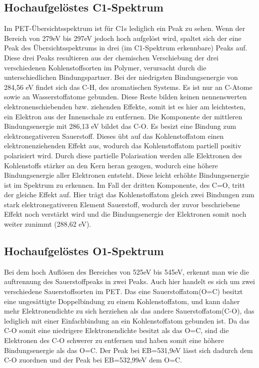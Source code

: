 \documentclass{article}
\begin{document}
\subsection{Hochaufgelöstes C1-Spektrum }

Im PET-Übersichtsspektrum ist für C1s lediglich ein Peak zu sehen. Wenn der Bereich von 279eV bis 297eV jedoch hoch aufgelöst wird, spaltet sich der eine Peak des Übersichtsspektrums in drei (im C1-Spektrum erkennbare) Peaks auf. Diese drei Peaks resultieren aus der chemischen Verschiebung der drei verschiedenen Kohlenstoffsorten im Polymer, verursacht durch die unterschiedlichen Bindungspartner. Bei der niedrigsten Bindungsenergie von 284,56 eV findet sich das C-H, des aromatischen Systems. Es ist nur an C-Atome sowie an Wasserstoffatome gebunden. Diese Reste bilden keinen nennenswerten elektronenschiebenden bzw. ziehenden Effekte, somit ist es hier am leichtesten, ein Elektron aus der Innenschale zu entfernen. Die Komponente der mittleren Bindungsenergie mit 286,13 eV bildet das C-O. Es besizt eine Bindung zum  elektronegativeren Sauerstoff. Dieses übt auf das Kohlenstoffatom einen elektronenziehenden Effekt aus, wodurch das Kohlenstoffatom partiell positiv polarisiert wird. Durch diese partielle Polarisation werden alle Elektronen des Kohlenstoffs stärker an den Kern heran gezogen, wodurch eine höhere Bindungsenergie aller Elektronen entsteht. Diese leicht erhöhte Bindungsenergie ist im Spektrum zu erkennen.
Im Fall der dritten Komponente, des C=O,  tritt der gleiche Effekt auf. Hier trägt das Kohlenstoffatom gleich zwei Bindungen zum stark elektronegativeren Element Sauerstoff, wodurch der zuvor beschriebene Effekt noch verstärkt wird und die Bindungsenergie der Elektronen somit noch weiter zunimmt (288,62 eV).

\subsection{Hochaufgelöstes O1-Spektrum}

Bei dem hoch Auflösen des Bereiches von 525eV bis 545eV, erkennt man wie die auftrennung des Sauerstoffpeaks in zwei Peaks. Auch hier handelt es sich um zwei verschiedene Sauerstoffsorten im PET. Das eine Sauerstoffatom(O=C) besitzt eine ungesättigte Doppelbindung zu einem Kohlenstoffatom, und kann daher mehr Elektronendichte zu sich herziehen als das andere Sauerstoffatom(C-O), das lediglich mit einer Einfachbindung an ein Kohlenstoffatom gebunden ist. Da das C-O somit eine niedrigere Elektronendichte besitzt als das O=C, sind die Elektronen des C-O schwerer zu entfernen und haben somit eine höhere Bindungsenergie als das O=C. Der Peak bei EB=531,9eV lässt sich dadurch dem C-O zuordnen und der Peak bei EB=532,99eV dem O=C.
\end{document}
